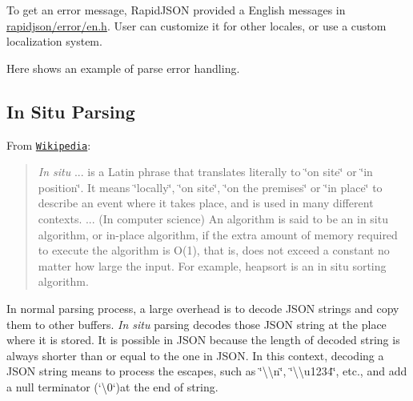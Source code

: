 To get an error message, Rapid\+J\+S\+ON provided a English messages in {\ttfamily \hyperlink{en_8h_source}{rapidjson/error/en.\+h}}. User can customize it for other locales, or use a custom localization system.

Here shows an example of parse error handling.


\hypertarget{md_Cadriciel_Commun_Externe_RapidJSON_doc_dom.zh-cn_InSituParsing}{}\subsection{In Situ Parsing}\label{md_Cadriciel_Commun_Externe_RapidJSON_doc_dom.zh-cn_InSituParsing}
From \href{http://en.wikipedia.org/wiki/In_situ}{\tt Wikipedia}\+:

\begin{quote}
{\itshape In situ} ... is a Latin phrase that translates literally to \char`\"{}on site\char`\"{} or \char`\"{}in position\char`\"{}. It means \char`\"{}locally\char`\"{}, \char`\"{}on site\char`\"{}, \char`\"{}on the premises\char`\"{} or \char`\"{}in place\char`\"{} to describe an event where it takes place, and is used in many different contexts. ... (In computer science) An algorithm is said to be an in situ algorithm, or in-\/place algorithm, if the extra amount of memory required to execute the algorithm is O(1), that is, does not exceed a constant no matter how large the input. For example, heapsort is an in situ sorting algorithm. \end{quote}


In normal parsing process, a large overhead is to decode J\+S\+ON strings and copy them to other buffers. {\itshape In situ} parsing decodes those J\+S\+ON string at the place where it is stored. It is possible in J\+S\+ON because the length of decoded string is always shorter than or equal to the one in J\+S\+ON. In this context, decoding a J\+S\+ON string means to process the escapes, such as {\ttfamily \char`\"{}\textbackslash{}\textbackslash{}n\char`\"{}}, {\ttfamily \char`\"{}\textbackslash{}\textbackslash{}u1234\char`\"{}}, etc., and add a null terminator (`\textquotesingle{}\textbackslash{}0\textquotesingle{}`)at the end of string.

